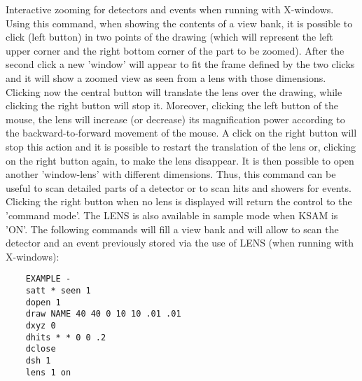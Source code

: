    \par
Interactive zooming for detectors and events when running with X-windows. 
   Using this command, when showing the contents of a view bank, it is 
   possible to click (left button) in two points of the drawing (which will 
   represent the left upper corner and the right bottom corner of the part to 
   be zoomed). After the second click a new 'window' will appear to fit the 
   frame defined by the two clicks and it will show a zoomed view as seen from 
   a lens with those dimensions. Clicking now the central button will 
   translate the lens over the drawing, while clicking the right button will 
   stop it. Moreover, clicking the left button of the mouse, the lens will 
   increase (or decrease) its magnification power according to the 
   backward-to-forward movement of the mouse.  A click on the right button 
   will stop this action and it is possible to restart the translation of the 
   lens or, clicking on the right button again, to make the lens disappear. It 
   is then possible to open another 'window-lens' with different dimensions. 
   Thus, this command can be useful to scan detailed parts of a detector or to 
   scan hits and showers for events. Clicking the right button when no lens is 
   displayed will return the control to the 'command mode'. The LENS is also 
   available in sample mode when KSAM is 'ON'.  The following commands will 
   fill a view bank and will allow to scan the detector and an event 
   previously stored via the use of LENS (when running with X-windows):  
\begin{verbatim}
    EXAMPLE -
    satt * seen 1
    dopen 1
    draw NAME 40 40 0 10 10 .01 .01
    dxyz 0
    dhits * * 0 0 .2
    dclose
    dsh 1
    lens 1 on
\end{verbatim}

\ENDCMD


\BEGARG
{}
\ENDARG

